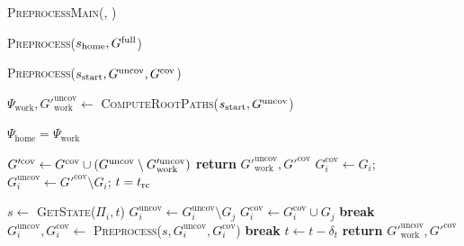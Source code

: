 \documentclass[a4paper]{report}
\begin{document}
\begin{algorithm}[t]
\caption{\textsc{PreprocessMain(\Shome, \Gfull)}}\label{alg:all}
    \AlgFontSize
\begin{algorithmic}[1]
    \State \textsc{Preprocess}($s_{\textrm{home}}, G^{\textrm{full}}$)
\end{algorithmic}
\end{algorithm}
%
\begin{algorithm}[t]
\caption{\textsc{Preprocess}($s_{\textrm{start}},G^{\textrm{uncov}},G^{\textrm{cov}} $)}\label{alg:preprocess}
    \AlgFontSize
\begin{algorithmic}[1]
\State $\Psi_{\textrm{work}}, G'^{\textrm{uncov}}_{\textrm{work}} \leftarrow$ \textsc{ComputeRootPaths}($s_{\textrm{start}},G^{\textrm{uncov}}$)

\If {$\Sstart = \Shome$}
    \State $\Psi_{\textrm{home}} = \Psi_{\textrm{work}}$
\EndIf

\State $G'^{\textrm{cov}} \leftarrow 
    G^{\textrm{cov}} \cup (G^{\textrm{uncov}} \setminus G'^{\textrm{uncov}}_{\textrm{work}})$
    \State \textbf{return} $G'^{\textrm{uncov}}_{\textrm{work}}, G'^{\textrm{cov}}$
\EndIf
{}
    \State $G_i^{\textrm{cov}} \leftarrow G_i$;
            \hspace{2mm}
           $G_i^{\textrm{uncov}} \leftarrow G'^{\textrm{cov}} \setminus G_i$;
            \hspace{2mm}
           $t = t_{\textrm{rc}}$

        \State $s \leftarrow$ \textsc{GetState($\Pi_i, t$)}
        \label{alg:preprocess:line:latch1a}
                \State $G_i^{\textrm{uncov}} \leftarrow G_i^{\textrm{uncov}} \setminus G_j$
                \State $G_i^{\textrm{cov}} \leftarrow G_i^{\textrm{cov}} \cup G_j$
                \label{alg:preprocess:line:latch1b}
            \EndIf
        \EndFor
            \State \textbf{break}
        \EndIf
        \State $G_i^{\textrm{uncov}},G_i^{\textrm{cov}} \leftarrow$ \textsc{Preprocess}($s,G_i^{\textrm{uncov}},G_i^{\textrm{cov}}$)
            \State \textbf{break}
        \EndIf
        \State $t \leftarrow t - \delta_t$
    \EndWhile
\EndFor
\State \textbf{return} $G'^{\textrm{uncov}}_{\textrm{work}}, G'^{\textrm{cov}}$

\end{algorithmic}
\end{algorithm}
\end{document}
